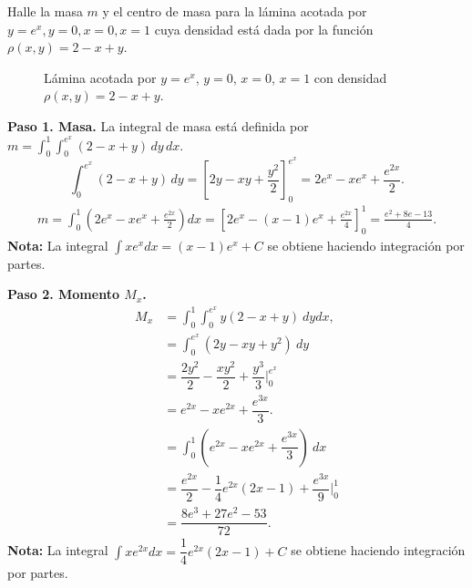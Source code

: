 \begin{prob}
Halle la masa $m$ y el centro de masa para la lámina acotada por $y=e^x,y=0,x=0,x=1$ cuya densidad está dada por la función $\rho (x,y)=2-x+y.$
\begin{myproof}
\begin{figure}[H]
\centering
{}
\caption{Lámina acotada por $y=e^x$, $y=0$, $x=0$, $x=1$ con densidad $\rho(x,y)=2-x+y$.}
\label{fig:lamina_exp_masa}
\end{figure}
\textbf{Paso 1. Masa.} La integral de masa está definida por $m=\displaystyle\int_{0}^{1}\int_{0}^{e^x}(2-x+y)\,dy\,dx.$
\[
\int_{0}^{e^x}(2-x+y)\,dy=\left[2y-xy+\frac{y^2}{2}\right]_{0}^{e^x}=2e^x-xe^x+\frac{e^{2x}}{2}.
\]
\begin{align*}
m=\int_{0}^{1}\!\left( 2e^x-xe^x+\frac{e^{2x}}{2} \right)dx
=\left[2e^x-(x-1)e^x+\frac{e^{2x}}{4}\right]_0^1
=\frac{e^2+8e-13}{4}.
\end{align*}
\textbf{Nota:} La integral $\displaystyle\int xe^{x}dx=(x-1)e^x+C$ se obtiene haciendo integración por partes.

\textbf{Paso 2. Momento $M_x$.}
\begin{align*}
M_{x}&=\int_{0}^{1}\int_{0}^{e^x}y\left(2-x+y\right)\ dydx,\\
&=\int_{0}^{e^x}\left(2y-xy+y^2\right)\ dy  \\ &=\dfrac{2y^2}{2}-\dfrac{xy^2}{2}+\dfrac{y^3}{3}\Big|_{0}^{e^x}\\&=e^{2x}-xe^{2x}+\dfrac{e^{3x}}{3}.\\
&=\int_{0}^{1} \left( e^{2x}-xe^{2x}+\dfrac{e^{3x}}{3} \right) \ dx  \\
&= \dfrac{e^{2x}}{2}-\dfrac{1}{4}e^{2x}\left( 2x-1 \right)+\dfrac{e^{3x}}{9}\Big|_{0}^{1}\\
&=\dfrac{8e^3+27e^2-53}{72}.
\end{align*}
\textbf{Nota:} La integral $\displaystyle\int xe^{2x}dx=\dfrac{1}{4}e^{2x}(2x-1)+C$ se obtiene haciendo integración por partes.


\end{myproof}
\end{prob}
